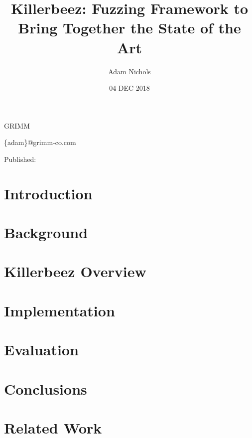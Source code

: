 \documentclass{article}
\title{Killerbeez: Fuzzing Framework to Bring Together the State of the Art}
\author{Adam Nichols}
\date{04 DEC 2018}
\begin{document}
\makeatletter
\centerline{\Large{\textbf{\@title}}}

\centerline{\@author}

\centerline{GRIMM}

\centerline{\{adam\}@grimm-co.com}

\centerline{Published: \@date}
\makeatother


\begin{multicols}{2}

\section{Introduction} \label{Introduction}


\section{Background} \label{Background}


\section{Killerbeez Overview} \label{Killerbeez Overview}


\section{Implementation} \label{Implementation}


\section{Evaluation} \label{Evaluation}

\section{Conclusions} \label{Conclusions}

\section{Related Work} \label{Related Work}



\end{multicols}
\end{document}
